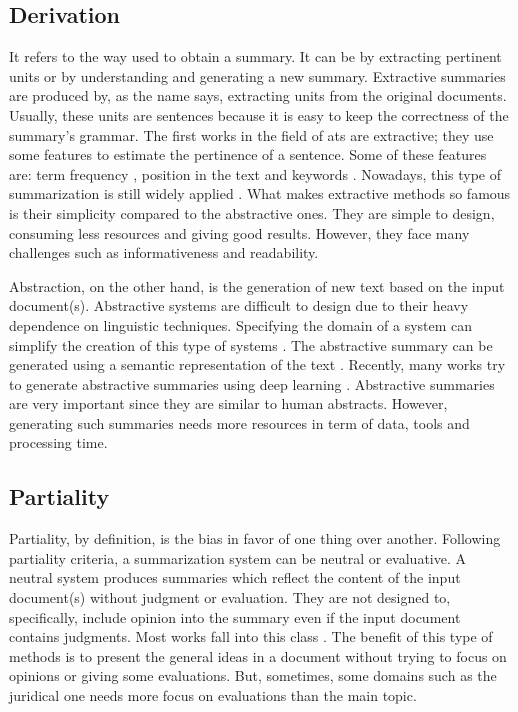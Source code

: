 \subsection{Derivation}

It refers to the way used to obtain a summary. 
It can be by extracting pertinent units or by understanding and generating a new summary.
Extractive summaries are produced by, as the name says, extracting units from the original documents. 
Usually, these units are sentences because it is easy to keep the correctness of the summary's grammar.
The first works in the field of \ac{ats} are extractive; they use some features to estimate the pertinence of a sentence.
Some of these features are: term frequency \citep{58-luhn}, position in the text \citep{58-baxendale,69-edmundson} and keywords \citep{69-edmundson}. 
Nowadays, this type of summarization is still widely applied \citep{17-ren-al,18-aries-al,19-liang-al}.
What makes extractive methods so famous is their simplicity compared to the abstractive ones. 
They are simple to design, consuming less resources and giving good results.
However, they face many challenges such as informativeness and readability.

Abstraction, on the other hand, is the generation of new text based on the input document(s).
Abstractive systems are difficult to design due to their heavy dependence on linguistic techniques.
Specifying the domain of a system can simplify the creation of this type of systems \citep{93-mitkov}.
The abstractive summary can be generated using a semantic representation of the text \citep{15-liu-al,19-barros-al,19-li-zhuge}.
Recently, many works try to generate abstractive summaries using deep learning \citep{15-rush-al,16-nallapati-al,17-ling-rush,19-you-al,19-shen-al}.
Abstractive summaries are very important since they are similar to human abstracts. 
However, generating such summaries needs more resources in term of data, tools and processing time.

\subsection{Partiality}

Partiality, by definition, is the bias in favor of one thing over another. 
Following partiality criteria, a summarization system can be neutral or evaluative.
A neutral system produces summaries which reflect the content of the input document(s) without judgment or evaluation. 
They are not designed to, specifically, include opinion into the summary even if the input document contains judgments.
Most works fall into this class \citep{58-luhn,58-baxendale,69-edmundson,15-vanetik-litvak,15-aries-al,15-vicente-al,15-thomas-al,15-zhong-al}.
The benefit of this type of methods is to present the general ideas in a document without trying to focus on opinions or giving some evaluations.
But, sometimes, some domains such as the juridical one needs more focus on evaluations than the main topic.

